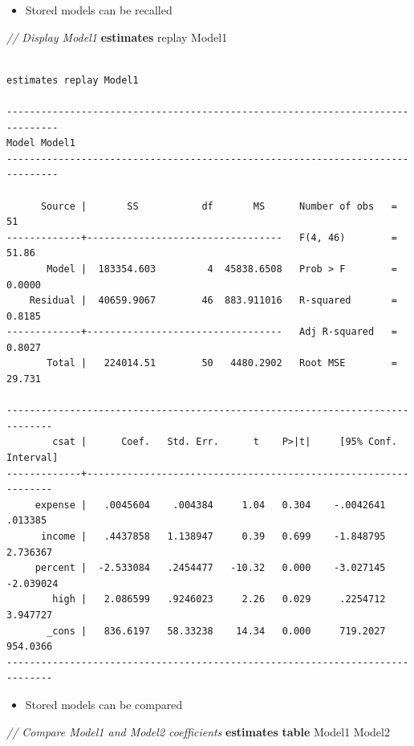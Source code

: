 \documentclass[
]{book}
\newenvironment{Shaded}{\begin{snugshade}}{\end{snugshade}}
\newcommand{\CommentTok}[1]{\textcolor[rgb]{0.56,0.35,0.01}{\textit{#1}}}
\newcommand{\FunctionTok}[1]{\textcolor[rgb]{0.00,0.00,0.00}{#1}}
\newcommand{\KeywordTok}[1]{\textcolor[rgb]{0.13,0.29,0.53}{\textbf{#1}}}
\newcommand{\NormalTok}[1]{#1}
\providecommand{\tightlist}{%
  \setlength{\itemsep}{0pt}\setlength{\parskip}{0pt}}
\begin{document}
\begin{itemize}
\tightlist
\item
  Stored models can be recalled
\end{itemize}

\begin{Shaded}
\begin{Highlighting}[]
  \CommentTok{// Display Model1}
  \KeywordTok{estimates} \FunctionTok{replay}\NormalTok{ Model1}
\end{Highlighting}
\end{Shaded}

\begin{verbatim}

estimates replay Model1

-------------------------------------------------------------------------------
Model Model1
-------------------------------------------------------------------------------

      Source |       SS           df       MS      Number of obs   =        51
-------------+----------------------------------   F(4, 46)        =     51.86
       Model |  183354.603         4  45838.6508   Prob > F        =    0.0000
    Residual |  40659.9067        46  883.911016   R-squared       =    0.8185
-------------+----------------------------------   Adj R-squared   =    0.8027
       Total |   224014.51        50   4480.2902   Root MSE        =    29.731

------------------------------------------------------------------------------
        csat |      Coef.   Std. Err.      t    P>|t|     [95% Conf. Interval]
-------------+----------------------------------------------------------------
     expense |   .0045604    .004384     1.04   0.304    -.0042641     .013385
      income |   .4437858   1.138947     0.39   0.699    -1.848795    2.736367
     percent |  -2.533084   .2454477   -10.32   0.000    -3.027145   -2.039024
        high |   2.086599   .9246023     2.26   0.029     .2254712    3.947727
       _cons |   836.6197   58.33238    14.34   0.000     719.2027    954.0366
------------------------------------------------------------------------------
\end{verbatim}

\begin{itemize}
\tightlist
\item
  Stored models can be compared
\end{itemize}

\begin{Shaded}
\begin{Highlighting}[]
  \CommentTok{// Compare Model1 and Model2 coefficients}
  \KeywordTok{estimates} \KeywordTok{table}\NormalTok{ Model1 Model2}
\end{Highlighting}
\end{Shaded}
\end{document}
